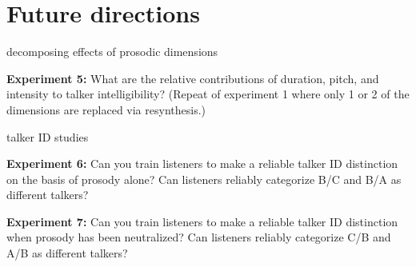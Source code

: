 \section{Future directions}
\begin{itm}
	\item{decomposing effects of prosodic dimensions}
	\begin{itm}
		\item{{\bfseries Experiment 5:} What are the relative contributions of duration, pitch, and intensity to talker intelligibility?  (Repeat of experiment 1 where only 1 or 2 of the dimensions are replaced via resynthesis.)}
	\end{itm}
	\item{talker ID studies}
	\begin{itm}
		\item{{\bfseries Experiment 6:} Can you train listeners to make a reliable talker ID distinction on the basis of prosody alone?  Can listeners reliably categorize B/C and B/A as different talkers?}
		\item{{\bfseries Experiment 7:} Can you train listeners to make a reliable talker ID distinction when prosody has been neutralized?  Can listeners reliably categorize C/B and A/B as different talkers?}
	\end{itm}
\end{itm}


